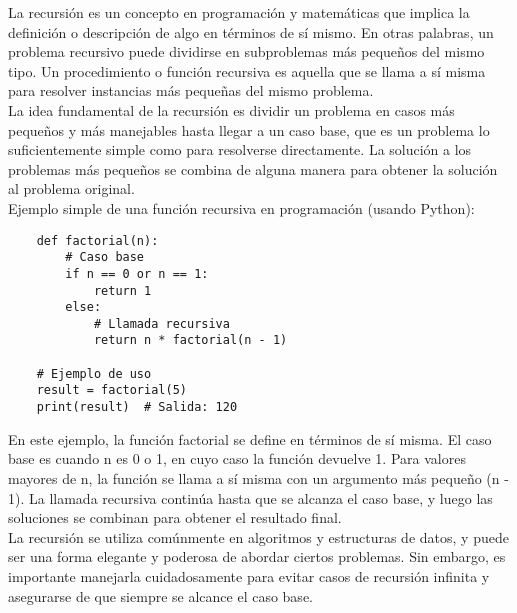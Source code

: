 
\noindent La recursión es un concepto en programación y matemáticas que implica la definición o descripción de algo en términos de sí mismo. En otras palabras, un problema recursivo puede dividirse en subproblemas más pequeños del mismo tipo. Un procedimiento o función recursiva es aquella que se llama a sí misma para resolver instancias más pequeñas del mismo problema. \\

\noindent La idea fundamental de la recursión es dividir un problema en casos más pequeños y más manejables hasta llegar a un caso base, que es un problema lo suficientemente simple como para resolverse directamente. La solución a los problemas más pequeños se combina de alguna manera para obtener la solución al problema original. \\

\noindent  Ejemplo simple de una función recursiva en programación (usando Python):\\

\begin{verbatim}
    def factorial(n):
        # Caso base
        if n == 0 or n == 1:
            return 1
        else:
            # Llamada recursiva
            return n * factorial(n - 1)
    
    # Ejemplo de uso
    result = factorial(5)
    print(result)  # Salida: 120

\end{verbatim}

\noindent En este ejemplo, la función factorial se define en términos de sí misma. El caso base es cuando n es 0 o 1, en cuyo caso la función devuelve 1. Para valores mayores de n, la función se llama a sí misma con un argumento más pequeño (n - 1). La llamada recursiva continúa hasta que se alcanza el caso base, y luego las soluciones se combinan para obtener el resultado final. \\

\noindent La recursión se utiliza comúnmente en algoritmos y estructuras de datos, y puede ser una forma elegante y poderosa de abordar ciertos problemas. Sin embargo, es importante manejarla cuidadosamente para evitar casos de recursión infinita y asegurarse de que siempre se alcance el caso base. \\

